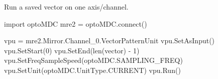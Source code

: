  Run a saved vector on one axis/channel. \begin{DoxyVerb}import optoMDC
mre2 = optoMDC.connect()

vpu = mre2.Mirror.Channel_0.VectorPatternUnit
vpu.SetAsInput()
vpu.SetStart(0)
vpu.SetEnd(len(vector) - 1)
vpu.SetFreqSampleSpeed(optoMDC.SAMPLING_FREQ)
vpu.SetUnit(optoMDC.UnitType.CURRENT)
vpu.Run()
\end{DoxyVerb}
 